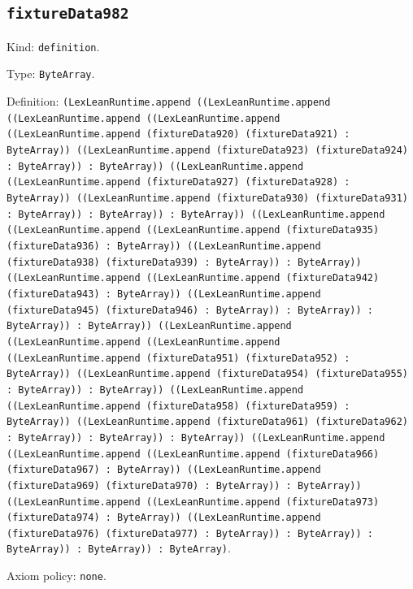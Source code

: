 \documentclass[11pt]{article}
\begin{document}
\subsection*{\texttt{fixtureData982}}
\noindent Kind: \texttt{definition}.\par
\noindent Type: \texttt{ByteArray}.\par
\noindent Definition: \texttt{(LexLeanRuntime.append ((LexLeanRuntime.append ((LexLeanRuntime.append ((LexLeanRuntime.append ((LexLeanRuntime.append (fixtureData920) (fixtureData921) : ByteArray)) ((LexLeanRuntime.append (fixtureData923) (fixtureData924) : ByteArray)) : ByteArray)) ((LexLeanRuntime.append ((LexLeanRuntime.append (fixtureData927) (fixtureData928) : ByteArray)) ((LexLeanRuntime.append (fixtureData930) (fixtureData931) : ByteArray)) : ByteArray)) : ByteArray)) ((LexLeanRuntime.append ((LexLeanRuntime.append ((LexLeanRuntime.append (fixtureData935) (fixtureData936) : ByteArray)) ((LexLeanRuntime.append (fixtureData938) (fixtureData939) : ByteArray)) : ByteArray)) ((LexLeanRuntime.append ((LexLeanRuntime.append (fixtureData942) (fixtureData943) : ByteArray)) ((LexLeanRuntime.append (fixtureData945) (fixtureData946) : ByteArray)) : ByteArray)) : ByteArray)) : ByteArray)) ((LexLeanRuntime.append ((LexLeanRuntime.append ((LexLeanRuntime.append ((LexLeanRuntime.append (fixtureData951) (fixtureData952) : ByteArray)) ((LexLeanRuntime.append (fixtureData954) (fixtureData955) : ByteArray)) : ByteArray)) ((LexLeanRuntime.append ((LexLeanRuntime.append (fixtureData958) (fixtureData959) : ByteArray)) ((LexLeanRuntime.append (fixtureData961) (fixtureData962) : ByteArray)) : ByteArray)) : ByteArray)) ((LexLeanRuntime.append ((LexLeanRuntime.append ((LexLeanRuntime.append (fixtureData966) (fixtureData967) : ByteArray)) ((LexLeanRuntime.append (fixtureData969) (fixtureData970) : ByteArray)) : ByteArray)) ((LexLeanRuntime.append ((LexLeanRuntime.append (fixtureData973) (fixtureData974) : ByteArray)) ((LexLeanRuntime.append (fixtureData976) (fixtureData977) : ByteArray)) : ByteArray)) : ByteArray)) : ByteArray)) : ByteArray)}.\par
\noindent Axiom policy: \texttt{none}.\par
\end{document}
